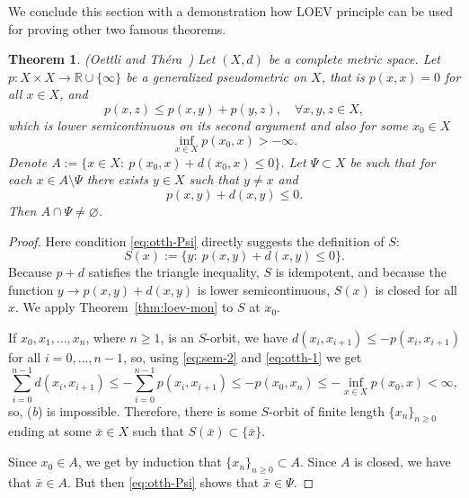 \documentclass[12pt]{article}
\newtheorem{theorem}{Theorem}[section]
\renewcommand{\emptyset}{\varnothing}
\begin{document}
    We conclude this section with a demonstration how LOEV principle can be used for proving other two famous theorems.

    \begin{theorem}(Oettli and Th\'era~\cite{Oettli_Thera})
        \label{thm:thera}
        Let $(X,d)$ be a complete metric space. Let
        $p:X\times X\to \mathbb{R}\cup\{\infty\}$
        be a generalized pseudometric on $X$, that is $p(x,x) = 0$ for all $x\in X$, and 
        \begin{equation}
            \label{eq:sem-2}
            p(x,z) \le p(x,y) + p(y,z),\quad\forall x,y,z\in X,
        \end{equation}
        which is lower semicontinuous on its second argument and also for some $x_0\in X$
        \begin{equation}
            \label{eq:otth-1}
            \inf_{x\in X} p(x_0,x) > -\infty.
        \end{equation}
        Denote $
            A := \{ x\in X:\ p(x_0,x) + d(x_0,x) \le 0\}$. 
            Let $\Psi\subset X$ be such that for each $x\in A\setminus\Psi$ there exists $y\in X$ such that $y\neq x$ and
        \begin{equation}
            \label{eq:otth-Psi}
            p(x,y) + d(x,y) \le 0.
        \end{equation}
        Then $A\cap\Psi\neq\emptyset$. 
        \end{theorem}
    \begin{proof}
        Here  condition \eqref{eq:otth-Psi} directly suggests the definition of $S$:
        $$
            S(x) := \{y:\ p(x,y) + d(x,y) \le 0\}.
        $$
        Because $p+d$ satisfies the triangle inequality, $S$ is idempotent, and because the function $y\to p(x,y) + d(x,y)$ is lower semicontinuous, $S(x)$ is closed for all $x$. We apply Theorem~\ref{thm:loev-mon} to $S$ at $x_0$.

        If $x_0,x_1,\ldots, x_n$, where $n\ge1$, is an $S$-orbit, we have $d(x_i,x_{i+1}) \le -p(x_i,x_{i+1})$ for all $i=0,\dots,n-1$, so, using \eqref{eq:sem-2} and \eqref{eq:otth-1} we get
        $$
            \sum_{i=0}^{n-1}d(x_i,x_{i+1}) \le -\sum_{i=0}^{n-1}p(x_i,x_{i+1}) \le -p(x_0,x_n) \le -\inf_{x\in X}p(x_0,x) < \infty,
        $$
        so, (\emph{b}) is impossible. Therefore, there is some $S$-orbit of finite length $\{x_n\}_{n\ge0}$ ending at some $\bar x\in X$ such that $S(\bar x) \subset\{\bar x\}$.

        Since $x_0\in A$, we get by induction that $\{x_n\}_{n\ge0} \subset A$. Since $A$ is closed, we have that $\bar x\in A$. But then \eqref{eq:otth-Psi} shows that $\bar x\in\Psi$.
    \end{proof}
\end{document}
